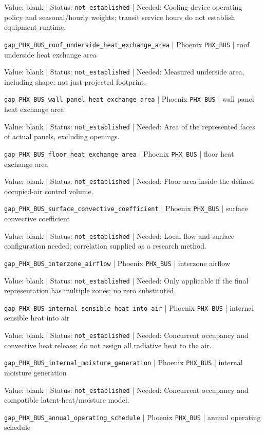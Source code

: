 Value: blank | Status: \nolinkurl{not_established} | Needed: Cooling-device operating policy and seasonal/hourly weights; transit service hours do not establish equipment runtime.

\nolinkurl{gap_PHX_BUS_roof_underside_heat_exchange_area} | Phoenix \nolinkurl{PHX_BUS}  | roof underside heat exchange area

Value: blank | Status: \nolinkurl{not_established} | Needed: Measured underside area, including shape; not just projected footprint.

\nolinkurl{gap_PHX_BUS_wall_panel_heat_exchange_area} | Phoenix \nolinkurl{PHX_BUS}  | wall panel heat exchange area

Value: blank | Status: \nolinkurl{not_established} | Needed: Area of the represented faces of actual panels, excluding openings.

\nolinkurl{gap_PHX_BUS_floor_heat_exchange_area} | Phoenix \nolinkurl{PHX_BUS}  | floor heat exchange area

Value: blank | Status: \nolinkurl{not_established} | Needed: Floor area inside the defined occupied-air control volume.

\nolinkurl{gap_PHX_BUS_surface_convective_coefficient} | Phoenix \nolinkurl{PHX_BUS}  | surface convective coefficient

Value: blank | Status: \nolinkurl{not_established} | Needed: Local flow and surface configuration needed; correlation supplied as a research method.

\nolinkurl{gap_PHX_BUS_interzone_airflow} | Phoenix \nolinkurl{PHX_BUS}  | interzone airflow

Value: blank | Status: \nolinkurl{not_established} | Needed: Only applicable if the final representation has multiple zones; no zero substituted.

\nolinkurl{gap_PHX_BUS_internal_sensible_heat_into_air} | Phoenix \nolinkurl{PHX_BUS}  | internal sensible heat into air

Value: blank | Status: \nolinkurl{not_established} | Needed: Concurrent occupancy and convective heat release; do not assign all radiative heat to the air.

\nolinkurl{gap_PHX_BUS_internal_moisture_generation} | Phoenix \nolinkurl{PHX_BUS}  | internal moisture generation

Value: blank | Status: \nolinkurl{not_established} | Needed: Concurrent occupancy and compatible latent-heat/moisture model.

\nolinkurl{gap_PHX_BUS_annual_operating_schedule} | Phoenix \nolinkurl{PHX_BUS}  | annual operating schedule

